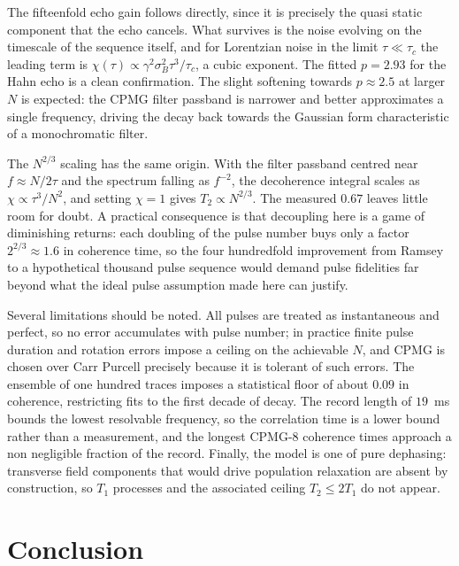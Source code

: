 \documentclass[conference]{IEEEtran}
\begin{document}
The fifteenfold echo gain follows directly, since it is precisely the quasi static
component that the echo cancels. What survives is the noise evolving on the
timescale of the sequence itself, and for Lorentzian noise in the limit
$\tau \ll \tau_c$ the leading term is
$\chi(\tau) \propto \gamma^2 \sigma_B^2 \tau^3/\tau_c$, a cubic exponent. The
fitted $p = 2.93$ for the Hahn echo is a clean confirmation. The slight softening
towards $p \approx 2.5$ at larger $N$ is expected: the CPMG filter passband is
narrower and better approximates a single frequency, driving the decay back
towards the Gaussian form characteristic of a monochromatic filter.

The $N^{2/3}$ scaling has the same origin. With the filter passband centred near
$f \approx N/2\tau$ and the spectrum falling as $f^{-2}$, the decoherence integral
scales as $\chi \propto \tau^3/N^2$, and setting $\chi = 1$ gives
$T_2 \propto N^{2/3}$. The measured $0.67$ leaves little room for doubt. A
practical consequence is that decoupling here is a game of diminishing returns:
each doubling of the pulse number buys only a factor $2^{2/3} \approx 1.6$ in
coherence time, so the four hundredfold improvement from Ramsey to a
hypothetical thousand pulse sequence would demand pulse fidelities far beyond what
the ideal pulse assumption made here can justify.

Several limitations should be noted. All pulses are treated as instantaneous and
perfect, so no error accumulates with pulse number; in practice finite pulse
duration and rotation errors impose a ceiling on the achievable $N$, and CPMG is
chosen over Carr Purcell precisely because it is tolerant of such errors. The
ensemble of one hundred traces imposes a statistical floor of about $0.09$ in
coherence, restricting fits to the first decade of decay. The record length of
$19$~ms bounds the lowest resolvable frequency, so the correlation time is a lower
bound rather than a measurement, and the longest CPMG-8 coherence times approach a
non negligible fraction of the record. Finally, the model is one of pure dephasing:
transverse field components that would drive population relaxation are absent by
construction, so $T_1$ processes and the associated ceiling $T_2 \le 2T_1$ do not
appear.

\section{Conclusion}
\end{document}
